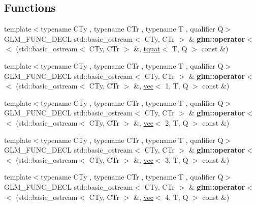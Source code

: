 \subsection*{Functions}
\begin{DoxyCompactItemize}
\item 
\mbox{\label{group__gtx__io_ga0d49970be1b7cdc10a2b027cea97c7e3}} 
{\footnotesize template$<$typename C\+Ty , typename C\+Tr , typename T , qualifier Q$>$ }\\G\+L\+M\+\_\+\+F\+U\+N\+C\+\_\+\+D\+E\+CL std\+::basic\+\_\+ostream$<$ C\+Ty, C\+Tr $>$ \& {\bfseries glm\+::operator$<$$<$} (std\+::basic\+\_\+ostream$<$ C\+Ty, C\+Tr $>$ \&, \hyperlink{structglm_1_1tquat}{tquat}$<$ T, Q $>$ const \&)
\item 
\mbox{\label{group__gtx__io_ga7a029530f08d465cd95b60186c625aba}} 
{\footnotesize template$<$typename C\+Ty , typename C\+Tr , typename T , qualifier Q$>$ }\\G\+L\+M\+\_\+\+F\+U\+N\+C\+\_\+\+D\+E\+CL std\+::basic\+\_\+ostream$<$ C\+Ty, C\+Tr $>$ \& {\bfseries glm\+::operator$<$$<$} (std\+::basic\+\_\+ostream$<$ C\+Ty, C\+Tr $>$ \&, \hyperlink{structglm_1_1vec}{vec}$<$ 1, T, Q $>$ const \&)
\item 
\mbox{\label{group__gtx__io_ga164ed8df8315066e091df1987617f188}} 
{\footnotesize template$<$typename C\+Ty , typename C\+Tr , typename T , qualifier Q$>$ }\\G\+L\+M\+\_\+\+F\+U\+N\+C\+\_\+\+D\+E\+CL std\+::basic\+\_\+ostream$<$ C\+Ty, C\+Tr $>$ \& {\bfseries glm\+::operator$<$$<$} (std\+::basic\+\_\+ostream$<$ C\+Ty, C\+Tr $>$ \&, \hyperlink{structglm_1_1vec}{vec}$<$ 2, T, Q $>$ const \&)
\item 
\mbox{\label{group__gtx__io_ga367fccf3eb4c54a7624e628b6131e76d}} 
{\footnotesize template$<$typename C\+Ty , typename C\+Tr , typename T , qualifier Q$>$ }\\G\+L\+M\+\_\+\+F\+U\+N\+C\+\_\+\+D\+E\+CL std\+::basic\+\_\+ostream$<$ C\+Ty, C\+Tr $>$ \& {\bfseries glm\+::operator$<$$<$} (std\+::basic\+\_\+ostream$<$ C\+Ty, C\+Tr $>$ \&, \hyperlink{structglm_1_1vec}{vec}$<$ 3, T, Q $>$ const \&)
\item 
\mbox{\label{group__gtx__io_ga6ce60b96203d549182f4df029007fb94}} 
{\footnotesize template$<$typename C\+Ty , typename C\+Tr , typename T , qualifier Q$>$ }\\G\+L\+M\+\_\+\+F\+U\+N\+C\+\_\+\+D\+E\+CL std\+::basic\+\_\+ostream$<$ C\+Ty, C\+Tr $>$ \& {\bfseries glm\+::operator$<$$<$} (std\+::basic\+\_\+ostream$<$ C\+Ty, C\+Tr $>$ \&, \hyperlink{structglm_1_1vec}{vec}$<$ 4, T, Q $>$ const \&)

\end{DoxyCompactItemize}
